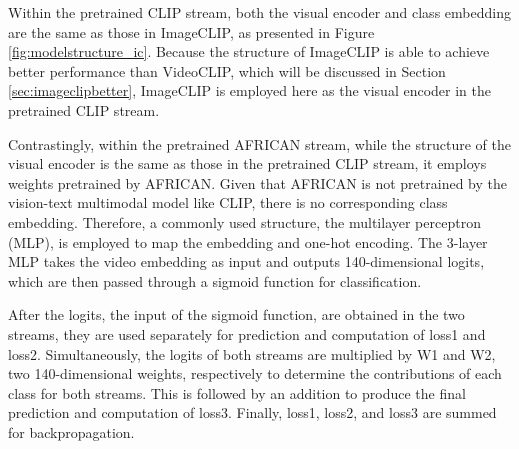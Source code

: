 Within the pretrained CLIP stream, both the visual encoder and class embedding are the same as those in ImageCLIP, as presented in Figure \ref{fig:modelstructure_ic}. Because the structure of ImageCLIP is able to achieve better performance than VideoCLIP, which will be discussed in Section \ref{sec:imageclipbetter}, ImageCLIP is employed here as the visual encoder in the pretrained CLIP stream. 

Contrastingly, within the pretrained AFRICAN stream, while the structure of the visual encoder is the same as those in the pretrained CLIP stream, it employs weights pretrained by AFRICAN. Given that AFRICAN is not pretrained by the vision-text multimodal model like CLIP, there is no corresponding class embedding. Therefore, a commonly used structure, the multilayer perceptron (MLP), is employed to map the embedding and one-hot encoding. The 3-layer MLP takes the video embedding as input and outputs 140-dimensional logits, which are then passed through a sigmoid function for classification.

After the logits, the input of the sigmoid function, are obtained in the two streams, they are used separately for prediction and computation of loss1 and loss2. Simultaneously, the logits of both streams are multiplied by W1 and W2, two 140-dimensional weights, respectively to determine the contributions of each class for both streams. This is followed by an addition to produce the final prediction and computation of loss3. Finally, loss1, loss2, and loss3 are summed for backpropagation. 
